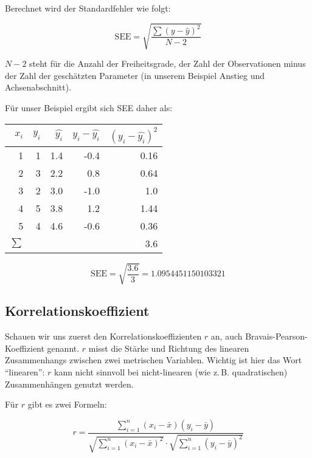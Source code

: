\documentclass[ngerman, 12pt]{scrartcl}
\begin{document}
Berechnet wird der Standardfehler wie folgt:

\begin{equation}
\text{SEE} = \sqrt{\frac{\sum (y-\hat{y})^2}{N-2}}
\end{equation}

\(N-2\) steht für die Anzahl der Freiheitsgrade, der Zahl der Observationen minus der Zahl der geschätzten Parameter (in unserem Beispiel Anstieg und Achsenabschnitt).

Für unser Beispiel ergibt sich SEE daher als:

\begin{center}
\begin{tabular}{r|rrrr} \toprule
\(x_i\) & \(y_i\)  & \(\hat{y_i}\) & \(y_i-\hat{y_i}\) & \((y_i-\hat{y_i})^2\) \\ \midrule
1 & 1 & 1.4 & -0.4 & 0.16 \\
2 & 3 & 2.2 & 0.8 & 0.64 \\
3 & 2 & 3.0 & -1.0  & 1.0	\\
4 & 5 & 3.8 & 1.2 & 1.44\\
5 & 4 & 4.6 &  -0.6 & 0.36\\ \midrule
\(\sum\) & & & & 3.6 \\ \bottomrule
\end{tabular}
\end{center}

\begin{equation}
\text{SEE} = \sqrt{\frac{3.6}{3}} = 1.0954451150103321
\end{equation}



\subsection{Korrelationskoeffizient}

Schauen wir uns zuerst den Korrelationskoeffizienten \(r\) an, auch Bravais-Pearson-Koeffizient  genannt. \(r\) misst die Stärke und Richtung des linearen Zusammenhangs zwischen zwei metrischen Variablen. Wichtig ist hier das Wort \enquote{linearen}: \(r\) kann nicht sinnvoll bei nicht-linearen (wie z.\,B. quadratischen) Zusammenhängen genutzt werden.

Für \(r\) gibt es zwei Formeln:

\begin{equation}
r = \frac{\sum_{i=1}^n (x_i - \bar{x})(y_i - \bar{y})}%
{ \sqrt{\sum_{i=1}^n (x_i - \bar{x})^2}  \cdot \sqrt{\sum_{i=1}^n (y_i - \bar{y})^2}}
\end{equation}
\end{document}
